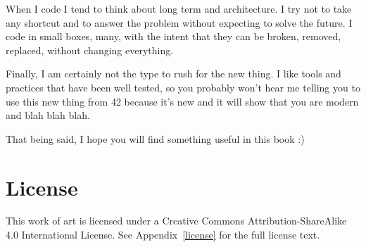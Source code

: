 When I code I tend to think about long term and architecture. I try
not to take any shortcut and to answer the problem without expecting
to solve the future. I code in small boxes, many, with the intent that
they can be broken, removed, replaced, without changing everything.

Finally, I am certainly not the type to rush for the new thing. I like
tools and practices that have been well tested, so you probably won't
hear me telling you to use this new thing from \cpp{}42 because it's
new and it will show that you are modern and blah blah blah.

\bigskip

That being said, I hope you will find something useful in this book :)

\section{License}
This work of art is licensed under a Creative Commons
Attribution-ShareAlike 4.0 International License. See
Appendix~\ref{license} for the full license text.

\renewcommand*\thesection{\arabic{chapter}.\arabic{section}}
